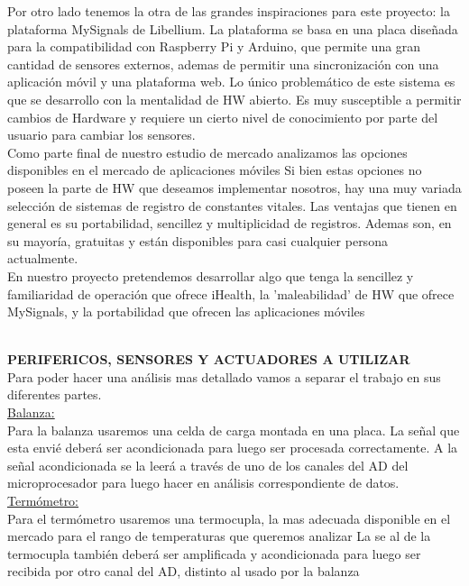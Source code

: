 \documentclass[11pt]{report}
\begin{document}
Por otro lado tenemos la otra de las grandes inspiraciones para este proyecto: la plataforma MySignals de Libellium. La plataforma se basa en una placa diseñada para la compatibilidad con Raspberry Pi y Arduino, que permite una gran cantidad de sensores externos, ademas de permitir una sincronización con una aplicación móvil y una plataforma
web. Lo único problemático de este sistema es que se desarrollo con la mentalidad de HW abierto. Es muy susceptible a permitir cambios de Hardware y requiere un cierto nivel de conocimiento por parte del usuario para cambiar los sensores.\\

Como parte final de nuestro estudio de mercado analizamos las opciones disponibles en el mercado de aplicaciones móviles Si bien estas opciones no poseen la parte de HW que deseamos implementar nosotros, hay una muy variada selección de sistemas de registro de constantes vitales. Las ventajas que tienen en general es su portabilidad, sencillez
y multiplicidad de registros. Ademas son, en su mayoría, gratuitas y están disponibles para casi cualquier persona actualmente.\\

En nuestro proyecto pretendemos desarrollar algo que tenga la sencillez y familiaridad de operación que ofrece iHealth, la 'maleabilidad' de HW que ofrece MySignals, y la portabilidad que ofrecen las aplicaciones móviles\\

\hfill
\\ \hfill

\noindent \large \textbf{PERIFERICOS, SENSORES Y ACTUADORES A UTILIZAR} \\

Para poder hacer una análisis mas detallado vamos a separar el trabajo en sus diferentes partes.\\

\noindent \underline{Balanza: }\\
Para la balanza usaremos una celda de carga montada en una placa. La señal que esta envié deberá ser acondicionada para luego ser procesada correctamente. A la señal acondicionada se la leerá a través de uno de los canales del AD del
microprocesador para luego hacer en análisis correspondiente de datos.\\

\noindent \underline{Termómetro:}\\
Para el termómetro usaremos una termocupla, la mas adecuada disponible en el mercado para el rango de temperaturas que queremos analizar La se al de la termocupla también deberá ser amplificada y acondicionada para
luego ser recibida por  otro canal del AD, distinto al usado por la balanza\\
\end{document}
